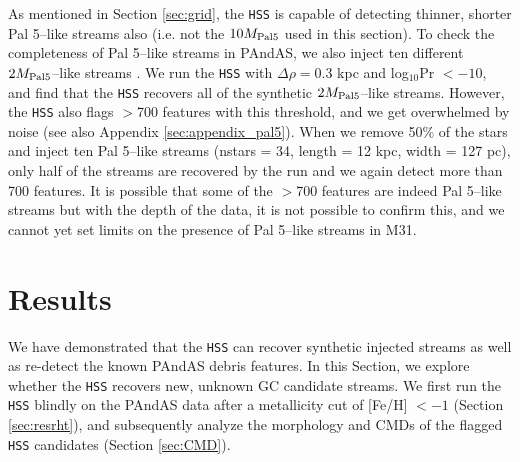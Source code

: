 \documentclass[twocolumn]{aastex631}
\begin{document}
As mentioned in Section \ref{sec:grid}, the \texttt{HSS} is capable of detecting thinner, shorter Pal 5--like streams also (i.e. not the $10{M}_{\rm Pal 5}$ used in this section). To check the completeness of Pal 5--like streams in PAndAS, we also inject ten different $2 {M}_{\rm Pal 5}$--like streams \citep[nstars = 68, length = 12 kpc, width = 127 pc; see Table 1 and Figure 1 in][]{pearson19}. We run the \texttt{HSS} with $\Delta\rho = 0.3$ kpc and log$_{10}$Pr $< -10$, and find that the \texttt{HSS} recovers all of the synthetic $2 {M}_{\rm Pal 5}$--like streams. However, the \texttt{HSS} also flags $>$700 features with this threshold, and we get overwhelmed by noise (see also Appendix \ref{sec:appendix_pal5}). When we remove 50\% of the stars and inject ten Pal 5--like streams (nstars = 34, length = 12 kpc, width = 127 pc), only half of the streams are recovered by the run and we again detect more than 700 features. It is possible that some of the $>$700 features are indeed Pal 5--like streams but with the depth of the data, it is not possible to confirm this, and we cannot yet set limits on the presence of Pal 5--like streams in M31. 

\section{Results}\label{sec:results}
We have demonstrated that the \texttt{HSS} can recover synthetic injected streams as well as re-detect the known PAndAS debris features. In this Section, we explore whether the \texttt{HSS} recovers new, unknown GC candidate streams. We first run the  \texttt{HSS} blindly on the PAndAS data after a metallicity cut of [Fe/H] $<-1$ (Section \ref{sec:resrht}), and subsequently analyze the morphology and CMDs of the flagged  \texttt{HSS} candidates (Section \ref{sec:CMD}).
\end{document}
